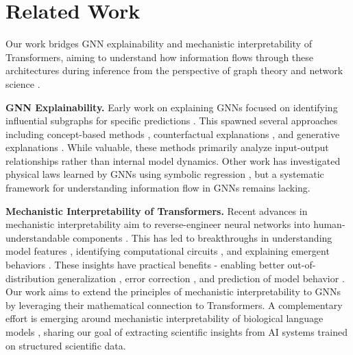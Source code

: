 \section{Related Work}
Our work bridges GNN explainability and mechanistic interpretability of Transformers, aiming to understand how information flows through these architectures during inference from the perspective of graph theory and network science \citep{rathkopf2018network,krickel2023and}.

\textbf{GNN Explainability.} Early work on explaining GNNs focused on identifying influential subgraphs for specific predictions \citep{ying2019gnnexplainer}. This spawned several approaches including concept-based methods \citep{magister2021gcexplainer}, counterfactual explanations \citep{lucic2022cfgnnexplainer}, and generative explanations \citep{Yuan_2020}. While valuable, these methods primarily analyze input-output relationships rather than internal model dynamics. Other work has investigated physical laws learned by GNNs using symbolic regression \citep{cranmer2020discovering}, but a systematic framework for understanding information flow in GNNs remains lacking.

\textbf{Mechanistic Interpretability of Transformers.} Recent advances in mechanistic interpretability aim to reverse-engineer neural networks into human-understandable components \citep{olah2022mechanistic,elhage2021mathematical}. This has led to breakthroughs in understanding model features \citep{olah2017feature,elhage2022toy}, identifying computational circuits \citep{nanda2023progress,cammarata2020thread:}, and explaining emergent behaviors \citep{barak2023hidden,wei2022emergent}. These insights have practical benefits - enabling better out-of-distribution generalization \citep{mu2021compositional}, error correction \citep{hernandez2022natural}, and prediction of model behavior \citep{meng2022locating}. 
Our work aims to extend the principles of mechanistic interpretability to GNNs by leveraging their mathematical connection to Transformers. 
A complementary effort is emerging around mechanistic interpretability of biological language models \citep{Zhang2024, simon2024interplm, adams2025from}, sharing our goal of extracting scientific insights from AI systems trained on structured scientific data. 

